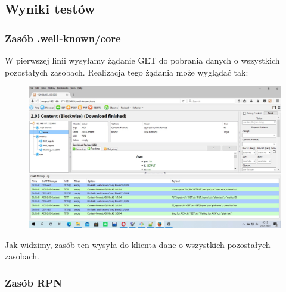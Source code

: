 \subsection {Wyniki testów}

\subsubsection{Zasób .well-known/core}

W pierwszej linii wysyłamy żądanie GET do pobrania danych o wszystkich pozostałych zasobach. Realizacja tego żądania może wyglądać tak:

\begin{figure}[h]
    \includegraphics[scale=0.5]{img/well_known.jpg}
\end{figure}
\vspace{0.5cm}

Jak widzimy, zasób ten wysyła do klienta dane o wszystkich pozostałych zasobach.

\subsubsection{Zasób RPN}

